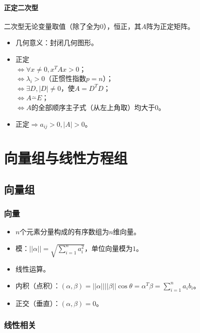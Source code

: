 \documentclass[
12pt, %
a4paper, 
oneside, %
headinclude,footinclude, %
]{scrartcl}
\begin{document}
\paragraph{正定二次型}
二次型无论变量取值（除了全为$ 0 $），恒正，其$ A $阵为正定矩阵。
\begin{itemize}
\item 几何意义：封闭几何图形。
\item 正定 \\
$ \Leftrightarrow $$ \forall x \neq 0, x^TAx > 0 $； \\
$ \Leftrightarrow $$ \lambda_i > 0 $（正惯性指数$ p = n $）； \\
$ \Leftrightarrow $$ \exists D, |D| \neq 0 $，使$ A = D^TD $； \\
$ \Leftrightarrow $$ A \overset{\sim}{-} E $； \\
$ \Leftrightarrow $$ A $的全部顺序主子式（从左上角取）均大于$ 0 $。
\item 正定$ \Rightarrow $$ a_{ij} > 0, |A| > 0 $。
\end{itemize}
\section{向量组与线性方程组}
\subsection[向量组]{向量组}
\subsubsection[向量]{向量}
\begin{itemize}
\item $ n $个元素分量构成的有序数组为$ n $维向量。
\item 模：$ ||\alpha|| = \sqrt{\sum_{i = 1}^n a_i^2} $，单位向量模为$ 1 $。
\item 线性运算。
\item 内积（点积）：$ (\alpha, \beta) = ||\alpha||||\beta|| \cos\theta = \alpha^T\beta = \sum_{i = 1}^n a_i b_i $。
\item 正交（垂直）：$ (\alpha, \beta) = 0 $。
\end{itemize}
\subsubsection[线性相关]{线性相关}
\end{document}
